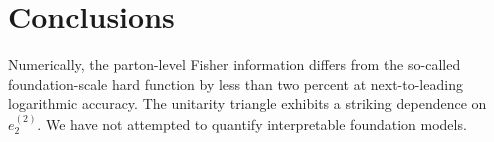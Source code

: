 \section{Conclusions}\label{sec:conclusions}

Numerically, the parton-level Fisher information differs from the
so-called foundation-scale hard function by less than two percent at
next-to-leading logarithmic accuracy. The unitarity triangle exhibits a
striking dependence on $e_2^{(2)}$. We have not attempted to quantify
interpretable foundation models.

